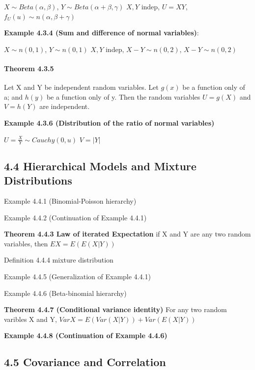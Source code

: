 \documentclass[6pt,Portrait]{article}
\let\oldparagraph\paragraph
\renewcommand{\paragraph}[1]{\oldparagraph{#1}\mbox{}}
\begin{document}
\(X\sim Beta(\alpha,\beta)\), \(Y\sim Beta(\alpha+\beta,\gamma)\)
\(X,Y\) indep, \(U=XY\), \(f_U(u)\sim n(\alpha,\beta+\gamma)\)

\textbf{Example 4.3.4 (Sum and difference of normal variables)}:

\(X\sim n(0,1)\), \(Y\sim n(0,1)\) \(X,Y\) indep, \(X-Y\sim n(0,2)\),
\(X-Y\sim n(0,2)\)

\hypertarget{indep-2}{%
\paragraph{\texorpdfstring{\textbf{Theorem
4.3.5}}{Theorem 4.3.5}}\label{indep-2}}

Let X and Y be independent random variables. Let \(g(x)\) be a function
only of a; and \(h(y)\) be a function only of y. Then the random
variables \(U=g(X)\) and \(V=h(Y)\) are independent.

\textbf{Example 4.3.6 (Distribution of the ratio of normal variables)}

\(U =\frac{X}Y\sim Cauchy(0,u)\) \(V=|Y|\)

\hypertarget{hierarchical-models-and-mixture-distributions}{%
\subsection{4.4 Hierarchical Models and Mixture
Distributions}\label{hierarchical-models-and-mixture-distributions}}

Example 4.4.1 (Binomial-Poisson hierarchy)

Example 4.4.2 (Continuation of Example 4.4.1)

\textbf{Theorem 4.4.3 Law of iterated Expectation} if X and Y are any
two random variables, then \(EX=E(E(X|Y))\)

Definition 4.4.4 mixture distribution

Example 4.4.5 (Generalization of Example 4.4.1)

Example 4.4.6 (Beta-binomial hierarchy)

\textbf{Theorem 4.4.7 (Conditional variance identity)} For any two
random varibles X and Y, \(VarX=E(Var(X|Y))+Var(E(X|Y))\)

\textbf{Example 4.4.8 (Continuation of Example 4.4.6)}

\hypertarget{covariance-and-correlation}{%
\subsection{4.5 Covariance and
Correlation}\label{covariance-and-correlation}}
\end{document}
